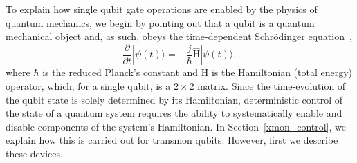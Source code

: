 \documentclass[journal]{IEEEtran}
\begin{document}
To explain how single qubit gate operations are enabled by the physics of quantum mechanics, we begin by pointing out that a qubit is a quantum mechanical object and, as such, obeys the time-dependent Schr\"odinger equation~\cite{sakurai1995modern},
\begin{equation}
\frac{\partial}{\partial{t}}|\psi\left(t\right)\rangle=-\frac{j}{\hbar}\hat{\mathrm{H}}|\psi\left(t\right)\rangle,
\end{equation}
where $\hbar$ is the reduced Planck's constant and $\hat{\mathrm{H}}$ is the Hamiltonian (total energy) operator, which, for a single qubit, is a $2\times2$ matrix. Since the time-evolution of the qubit state is solely determined by its Hamiltonian, deterministic control of the state of a quantum system requires the ability to systematically enable and disable components of the system's Hamiltonian. In Section~\ref{xmon_control}, we explain how this is carried out for transmon qubits. However,  first we describe these devices.

\end{document}
